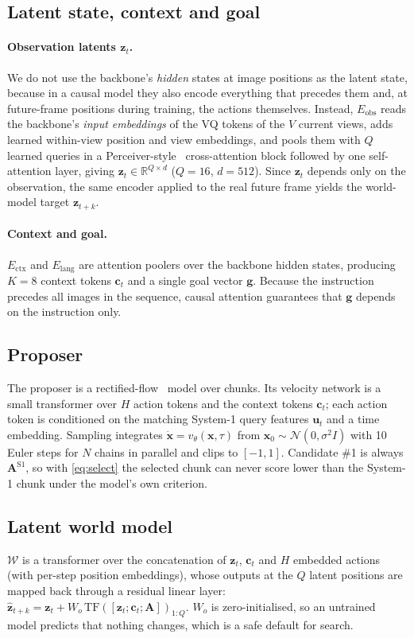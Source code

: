 \documentclass[11pt]{article}
\newcommand{\zt}{\bm{z}_t}
\newcommand{\zhat}{\hat{\bm{z}}_{t+k}}
\newcommand{\A}{\mathbf{A}}
\newcommand{\WM}{\mathcal{W}}
\begin{document}
\subsection{Latent state, context and goal}
\paragraph{Observation latents $\zt$.} We do not use the backbone's \emph{hidden} states at image positions as the latent state, because in a causal model they also encode everything that precedes them and, at future-frame positions during training, the actions themselves. Instead, $E_{\mathrm{obs}}$ reads the backbone's \emph{input embeddings} of the VQ tokens of the $V$ current views, adds learned within-view position and view embeddings, and pools them with $Q$ learned queries in a Perceiver-style~\citep{jaegle2021perceiver} cross-attention block followed by one self-attention layer, giving $\zt \in \mathbb{R}^{Q\times d}$ ($Q{=}16$, $d{=}512$). Since $\zt$ depends only on the observation, the same encoder applied to the real future frame yields the world-model target $\bm z_{t+k}$.

\paragraph{Context and goal.} $E_{\mathrm{ctx}}$ and $E_{\mathrm{lang}}$ are attention poolers over the backbone hidden states, producing $K{=}8$ context tokens $\bm c_t$ and a single goal vector $\bm g$. Because the instruction precedes all images in the sequence, causal attention guarantees that $\bm g$ depends on the instruction only.

\subsection{Proposer}
The proposer is a rectified-flow~\citep{liu2022rectified,lipman2022flow} model over chunks. Its velocity network is a small transformer over $H$ action tokens and the context tokens $\bm c_t$; each action token is conditioned on the matching System-1 query features $\bm u_t$ and a time embedding. Sampling integrates $\dot{\bm x}=v_\theta(\bm x,\tau)$ from $\bm x_0\sim\mathcal N(0,\sigma^2 I)$ with 10 Euler steps for $N$ chains in parallel and clips to $[-1,1]$. Candidate \#1 is always $\A^{\mathrm{S1}}$, so with \cref{eq:select} the selected chunk can never score lower than the System-1 chunk under the model's own criterion.

\subsection{Latent world model}
$\WM$ is a transformer over the concatenation of $\zt$, $\bm c_t$ and $H$ embedded actions (with per-step position embeddings), whose outputs at the $Q$ latent positions are mapped back through a residual linear layer: $\zhat = \zt + W_o\,\mathrm{TF}([\zt;\bm c_t;\A])_{1:Q}$. $W_o$ is zero-initialised, so an untrained model predicts that nothing changes, which is a safe default for search.
\end{document}

